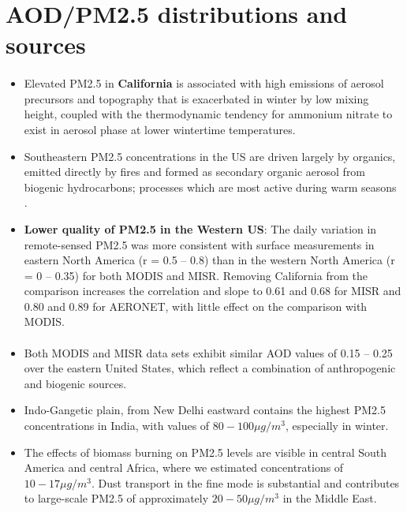 \documentclass[11pt]{article}
\begin{document}

\section{AOD/PM2.5 distributions and sources}

\paragraph{\citet{van2006estimating}}
\begin{itemize}
    \item Elevated PM2.5 in \textbf{California} is associated with high emissions of aerosol precursors and topography that is exacerbated in winter by low mixing height, coupled with the thermodynamic tendency for ammonium nitrate to exist in aerosol phase at lower wintertime temperatures. 
    \item Southeastern PM2.5 concentrations in the US are driven largely by organics, emitted directly by fires and formed as secondary organic aerosol from biogenic hydrocarbons; processes which are most active during warm seasons \citep{malm2004spatial}.
    \item \textbf{Lower quality of PM2.5 in the Western US}: The daily variation in remote-sensed PM2.5 was more consistent with surface measurements in eastern North America (r = 0.5 -- 0.8) than in the western North America (r = 0 -- 0.35) for both MODIS and MISR.  Removing California from the comparison increases the correlation and slope to 0.61 and 0.68 for MISR and 0.80 and 0.89 for AERONET, with little effect on the comparison with MODIS.
\end{itemize}

\paragraph{\citet{van2010global}}
\begin{itemize}
    \item Both MODIS and MISR data sets exhibit similar AOD values of 0.15 -- 0.25 over the eastern United States, which reflect a combination of anthropogenic and biogenic sources.
    \item Indo-Gangetic plain, from New Delhi eastward contains the highest PM2.5 concentrations in India, with values of $80 - 100 \mu g/m^3$, especially in winter. 
    \item The effects of biomass burning on PM2.5 levels are visible in central South America and central Africa, where we estimated concentrations of $10 - 17 \mu g/m^3$. Dust transport in the fine mode is substantial \citep{jones2007modis} and contributes to large-scale PM2.5 of approximately $20 - 50 \mu g/m^3$ in the Middle East.
\end{itemize}

\newpage



\end{document}
